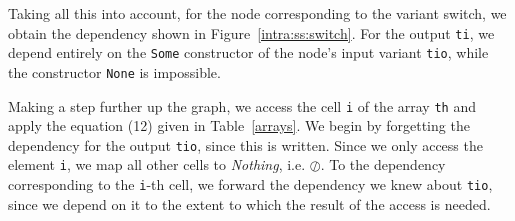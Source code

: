\documentclass[11pt]{article}
\newcommand{\snumber}[1]{\textrm{{\scriptsize(#1)}}}
\newcommand{\disp}[1]{\lstinline&#1&}
\begin{document}
Taking all this into account, for the node corresponding to the variant switch, 
we obtain the dependency shown in Figure~\ref{intra:ss:switch}. For the output 
\disp{ti}, we depend entirely on the \disp{Some} constructor of the node's 
input variant \disp{tio}, while the constructor \disp{None} is impossible.

Making a step further up the graph, we access the cell \disp{i} of the array 
\disp{th} and apply the equation \snumber{12} given in Table~\ref{arrays}. 
We begin by forgetting the dependency for the output \disp{tio}, 
since this is written. Since we only access the element \disp{i}, we map all 
other cells to \emph{Nothing}, i.e. $\oslash$. To the dependency corresponding 
to the \disp{i}-th cell, we forward the dependency we knew about \disp{tio}, 
since we depend on it to the extent to which the result of the access is needed.
\end{document}
